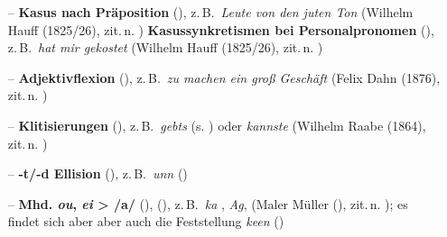 \begin{itemize}
	\item [–] \textbf{Kasus nach Präposition}   (\citealt[102]{Richter1995}), z.\,B.\, \textit{Leute von den juten Ton}  (Wilhelm Hauff  (1825/26), zit.\,n. \citealt[102]{Richter1995})\label{bspform4a} \textbf{Kasussynkretismen bei Personalpronomen}  (\citealt[102]{Richter1995}), z.\,B.\, \textit{hat mir gekostet}  (Wilhelm Hauff  (1825/26), zit.\,n. \citealt[102]{Richter1995})\label{bspform4b} 
	
	
	\item [–] \textbf{Adjektivflexion}  (\citealt[104]{Richter1995}), z.\,B.\, \textit{zu machen ein groß Geschäft}  (Felix Dahn  (1876), zit.\,n. \citealt[104]{Richter1995})\label{bspform1q} 
	  
\newpage 
	\item [–] \textbf{Klitisierungen}  (\citealt[101]{Richter1995}), z.\,B.\, \textit{gebts}   (s. \citealt[225 ]{Althaus1981}) oder \textit{kannste}  (Wilhelm Raabe  (1864), zit.\,n. \citealt[100]{Richter1995})\label{bspform3} 
	

	
		\item [–] \textbf{-t/-d Ellision}  (\citealt[143]{Neubauer1994}), z.\,B.\, \textit{unn}  (\citealt[143]{Neubauer1994})\label{bspform9} 

\item [–] \textbf{Mhd. \textit{ou}, \textit{ei} > /a\textlengthmark/} (\citealt[217]{Althaus1981}),  (\citealt[143]{Neubauer1994}), z.\,B.\, \textit{ka} , \textit{Ag},  (Maler Müller  (), zit.\,n. \citealt[217]{Althaus1981}); es findet sich aber aber auch die Feststellung  \textit{keen}   (\citealt[177]{Jenzsch1974})\label{bspform6} 
	

\end{itemize}
